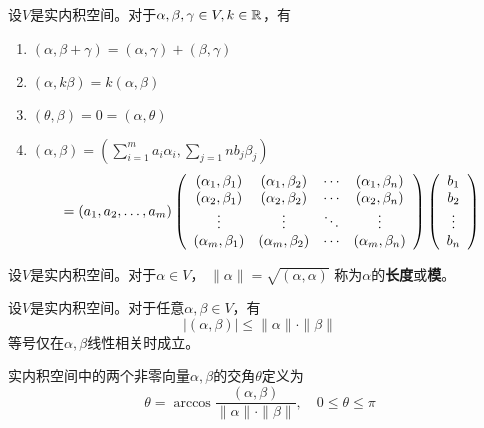 \begin{theorem}[实内积空间的性质] \label{thrm-real-inner-prod-space-prop}
  设$V$是实内积空间。对于$\alpha,\beta,\gamma\in V, k\in\mfR$，有
  \begin{enumerate}
    \item \label{thrm-RIPS-prop1}
    $(\alpha,\beta+\gamma)=(\alpha,\gamma)+(\beta,\gamma)$
    \item
    $(\alpha,k\beta)=k(\alpha,\beta)$
    \item
    $(\theta,\beta)=0=(\alpha,\theta)$
    \item
    $(\alpha,\beta)=
      \left(\sum_{i=1}^{m}a_i\alpha_i,\sum_{j=1}{n}b_j\beta_j\right) $
    \begin{equation} \label{eq-metric-mat}
      = (a_1,a_2,\dots,a_m) \mmat{cccc}{
        (\alpha_1,\beta_1)&(\alpha_1,\beta_2)&\cdots&(\alpha_1,\beta_n)\\
        (\alpha_2,\beta_1)&(\alpha_2,\beta_2)&\cdots&(\alpha_2,\beta_n)\\
        \vdots            &\vdots            &\ddots&\vdots            \\
        (\alpha_m,\beta_1)&(\alpha_m,\beta_2)&\cdots&(\alpha_m,\beta_n)}
        \mmat{c}{b_1 \\ b_2 \\ \vdots \\ b_n}
    \end{equation}
  \end{enumerate}
\end{theorem}

\begin{definition}[长度]
  设$V$是实内积空间。对于$\alpha\in V$，
  $\| \alpha \| = \sqrt{(\alpha,\alpha)}$
  称为$\alpha$的\textbf{长度}或\textbf{模}。
\end{definition}

\begin{theorem}
  设$V$是实内积空间。对于任意$\alpha,\beta\in V$，有
  \begin{displaymath}
    |(\alpha,\beta)| \le \|\alpha\|\cdot\|\beta\|
  \end{displaymath}
  等号仅在$\alpha,\beta$线性相关时成立。
\end{theorem}

\begin{definition}[交角]
  实内积空间中的两个非零向量$\alpha,\beta$的交角$\theta$定义为
  \begin{displaymath}
    \theta = \arccos\frac{(\alpha,\beta)}{\|\alpha\|\cdot\|\beta\|},
    \quad  0\le\theta\le\pi
  \end{displaymath}
\end{definition}


